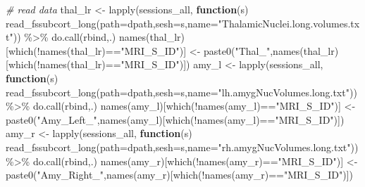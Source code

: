 \documentclass[
]{article}
\newenvironment{Shaded}{\begin{snugshade}}{\end{snugshade}}
\newcommand{\AttributeTok}[1]{\textcolor[rgb]{0.77,0.63,0.00}{#1}}
\newcommand{\CommentTok}[1]{\textcolor[rgb]{0.56,0.35,0.01}{\textit{#1}}}
\newcommand{\ControlFlowTok}[1]{\textcolor[rgb]{0.13,0.29,0.53}{\textbf{#1}}}
\newcommand{\FunctionTok}[1]{\textcolor[rgb]{0.00,0.00,0.00}{#1}}
\newcommand{\NormalTok}[1]{#1}
\newcommand{\OtherTok}[1]{\textcolor[rgb]{0.56,0.35,0.01}{#1}}
\newcommand{\SpecialCharTok}[1]{\textcolor[rgb]{0.00,0.00,0.00}{#1}}
\newcommand{\StringTok}[1]{\textcolor[rgb]{0.31,0.60,0.02}{#1}}
\begin{document}
\begin{Shaded}
\begin{Highlighting}[]
\CommentTok{\# read data}
\NormalTok{thal\_lr }\OtherTok{\textless{}{-}} \FunctionTok{lapply}\NormalTok{(sessions\_all, }\ControlFlowTok{function}\NormalTok{(s) }\FunctionTok{read\_fssubcort\_long}\NormalTok{(}\AttributeTok{path=}\NormalTok{dpath,}\AttributeTok{sesh=}\NormalTok{s,}\AttributeTok{name=}\StringTok{"ThalamicNuclei.long.volumes.txt"}\NormalTok{)) }\SpecialCharTok{\%\textgreater{}\%} \FunctionTok{do.call}\NormalTok{(rbind,.)}
\FunctionTok{names}\NormalTok{(thal\_lr)[}\FunctionTok{which}\NormalTok{(}\SpecialCharTok{!}\FunctionTok{names}\NormalTok{(thal\_lr)}\SpecialCharTok{==}\StringTok{"MRI\_S\_ID"}\NormalTok{)] }\OtherTok{\textless{}{-}} \FunctionTok{paste0}\NormalTok{(}\StringTok{"Thal\_"}\NormalTok{,}\FunctionTok{names}\NormalTok{(thal\_lr)[}\FunctionTok{which}\NormalTok{(}\SpecialCharTok{!}\FunctionTok{names}\NormalTok{(thal\_lr)}\SpecialCharTok{==}\StringTok{"MRI\_S\_ID"}\NormalTok{)])}
\NormalTok{amy\_l }\OtherTok{\textless{}{-}} \FunctionTok{lapply}\NormalTok{(sessions\_all, }\ControlFlowTok{function}\NormalTok{(s) }\FunctionTok{read\_fssubcort\_long}\NormalTok{(}\AttributeTok{path=}\NormalTok{dpath,}\AttributeTok{sesh=}\NormalTok{s,}\AttributeTok{name=}\StringTok{"lh.amygNucVolumes.long.txt"}\NormalTok{)) }\SpecialCharTok{\%\textgreater{}\%} \FunctionTok{do.call}\NormalTok{(rbind,.)}
\FunctionTok{names}\NormalTok{(amy\_l)[}\FunctionTok{which}\NormalTok{(}\SpecialCharTok{!}\FunctionTok{names}\NormalTok{(amy\_l)}\SpecialCharTok{==}\StringTok{"MRI\_S\_ID"}\NormalTok{)] }\OtherTok{\textless{}{-}} \FunctionTok{paste0}\NormalTok{(}\StringTok{"Amy\_Left\_"}\NormalTok{,}\FunctionTok{names}\NormalTok{(amy\_l)[}\FunctionTok{which}\NormalTok{(}\SpecialCharTok{!}\FunctionTok{names}\NormalTok{(amy\_l)}\SpecialCharTok{==}\StringTok{"MRI\_S\_ID"}\NormalTok{)])}
\NormalTok{amy\_r }\OtherTok{\textless{}{-}} \FunctionTok{lapply}\NormalTok{(sessions\_all, }\ControlFlowTok{function}\NormalTok{(s) }\FunctionTok{read\_fssubcort\_long}\NormalTok{(}\AttributeTok{path=}\NormalTok{dpath,}\AttributeTok{sesh=}\NormalTok{s,}\AttributeTok{name=}\StringTok{"rh.amygNucVolumes.long.txt"}\NormalTok{)) }\SpecialCharTok{\%\textgreater{}\%} \FunctionTok{do.call}\NormalTok{(rbind,.)}
\FunctionTok{names}\NormalTok{(amy\_r)[}\FunctionTok{which}\NormalTok{(}\SpecialCharTok{!}\FunctionTok{names}\NormalTok{(amy\_r)}\SpecialCharTok{==}\StringTok{"MRI\_S\_ID"}\NormalTok{)] }\OtherTok{\textless{}{-}} \FunctionTok{paste0}\NormalTok{(}\StringTok{"Amy\_Right\_"}\NormalTok{,}\FunctionTok{names}\NormalTok{(amy\_r)[}\FunctionTok{which}\NormalTok{(}\SpecialCharTok{!}\FunctionTok{names}\NormalTok{(amy\_r)}\SpecialCharTok{==}\StringTok{"MRI\_S\_ID"}\NormalTok{)])}

\end{Highlighting}
\end{Shaded}
\end{document}
